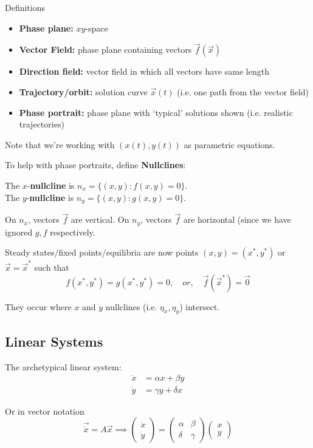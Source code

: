 \documentclass{X:/Documents/Coding/Latex/myassignment}
\begin{document}
Definitions
\begin{itemize}
    \item \textbf{Phase plane:} $xy$-space
    \item \textbf{Vector Field:} phase plane containing vectors $\vec f(\vec x)$
    \item \textbf{Direction field:} vector field in which all vectors have same length
    \item \textbf{Trajectory/orbit:} solution curve $\vec x(t)$ (i.e. one path from the vector field)
    \item \textbf{Phase portrait:} phase plane with `typical' solutions shown (i.e. realistic trajectories)
\end{itemize}
Note that we're working with $(x(t),y(t))$ as parametric equations.

To help with phase portraits, define \textbf{Nullclines}:

The $x$-\textbf{nullcline} is $n_x=\{(x,y) : f(x,y) = 0\}$.\\
The $y$-\textbf{nullcline} is $n_y=\{(x,y) : g(x,y) = 0\}$.

On $n_x$, vectors $\vec f$ are vertical. On $n_y$, vectors $\vec f$ are horizontal (since we have ignored $g,f$ respectively.

Steady states/fixed points/equilibria are now points $(x,y) = (x^*,y^*)$ or $\vec x = \vec x^*$ such that
\[f(x^*,y^*) = g(x^*,y^*) = 0, \quad or, \quad  \vec f (\vec x^*) = \vec 0\]

They occur where $x$ and $y$ nullclines (i.e. $\eta_x,\eta_y$) intersect.

\subsection{Linear Systems}
The archetypical linear system:
\begin{align*}
    \dot x &= \alpha x + \beta y\\
    \dot y &= \gamma y + \delta x
\end{align*}

Or in vector notation
\[\vec{\dot x} = A\vec x \implies 
\begin{pmatrix}\dot x\\\dot y\end{pmatrix} =
\begin{pmatrix}\alpha & \beta \\\delta &\gamma \end{pmatrix}
\begin{pmatrix}x\\y\end{pmatrix}
\]
\end{document}
